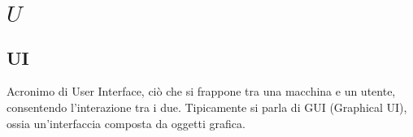 \section{\quad$U\quad$}
\subsection{UI}
Acronimo di User Interface, ciò che si frappone tra una macchina e un utente, consentendo l’interazione tra i due. 
Tipicamente si parla di GUI (Graphical UI), ossia un’interfaccia composta da oggetti grafica.

